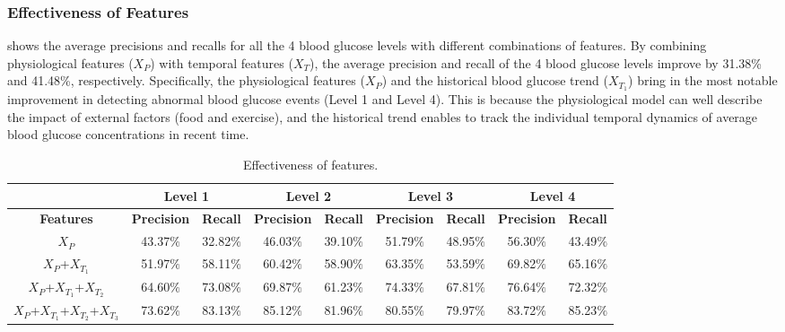 \subsubsection{Effectiveness of Features}
 shows the average precisions and recalls for all the 4 blood glucose levels with different combinations of features.
By combining physiological features ($X_{P}$) with temporal features ($X_{T}$), the average precision and recall of the 4 blood glucose levels improve by 31.38\% and 41.48\%, respectively.
Specifically, the physiological features ($X_{P}$) and the historical blood glucose trend ($X_{T_1}$) bring in the most notable improvement in detecting abnormal blood glucose events (Level 1 and Level 4).
This is because the physiological model can well describe the impact of external factors (\eg food and exercise), and the historical trend enables to track the individual temporal dynamics of average blood glucose concentrations in recent time. 

\begin{table}[h]
  \small
  \centering
  \caption{Effectiveness of features.}
  \label{tab:features}
  \begin{tabular}{|c|c|c|c|c|c|c|c|c|}
  \hline
                                   & \multicolumn{2}{c|}{\textbf{Level 1}}                     & \multicolumn{2}{c|}{\textbf{Level 2}} & \multicolumn{2}{c|}{\textbf{Level 3}}                     & \multicolumn{2}{c|}{\textbf{Level 4}}                     \\ \hline
  \textbf{Features}                  & \textbf{Precision} & \multicolumn{1}{l|}{\textbf{Recall}} & \textbf{Precision}  & \textbf{Recall} & \textbf{Precision} & \multicolumn{1}{l|}{\textbf{Recall}} & \textbf{Precision} & \multicolumn{1}{l|}{\textbf{Recall}} \\ \hline
  $X_{P}$                            & 43.37$\%$               & 32.82$\%$                                 & 46.03$\%$                & 39.10$\%$            & 51.79$\%$               & 48.95$\%$                                 & 56.30$\%$               & 43.49$\%$                                 \\ \hline
  $X_{P}$+$X_{T_1}$                   & 51.97$\%$               & 58.11$\%$                                 & 60.42$\%$                & 58.90$\%$            & 63.35$\%$               & 53.59$\%$                                 & 69.82$\%$               & 65.16$\%$                                 \\ \hline
  $X_{P}$+$X_{T_1}$+$X_{T_2}$          & 64.60$\%$               & 73.08$\%$                                 & 69.87$\%$                & 61.23$\%$            & 74.33$\%$               & 67.81$\%$                                 & 76.64$\%$               & 72.32$\%$                                 \\ \hline
  $X_{P}$+$X_{T_1}$+$X_{T_2}$+$X_{T_3}$ & 73.62$\%$   & 83.13$\%$                                 & 85.12$\%$               & 81.96$\%$            & 80.55$\%$   & 79.97$\%$
  & 83.72$\%$               & 85.23$\%$                                  \\ \hline
  \end{tabular}
\end{table}


